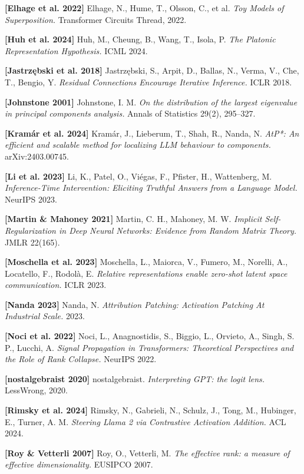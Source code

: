 \documentclass[10pt,letterpaper,twocolumn]{article}
\begin{document}
\textbf{{[}Elhage et al. 2022{]}} Elhage, N., Hume, T., Olsson, C., et al. \emph{Toy Models of Superposition.} Transformer Circuits Thread, 2022.

\textbf{{[}Huh et al. 2024{]}} Huh, M., Cheung, B., Wang, T., Isola, P. \emph{The Platonic Representation Hypothesis.} ICML 2024.

\textbf{{[}Jastrzębski et al. 2018{]}} Jastrzębski, S., Arpit, D., Ballas, N., Verma, V., Che, T., Bengio, Y. \emph{Residual Connections Encourage Iterative Inference.} ICLR 2018.

\textbf{{[}Johnstone 2001{]}} Johnstone, I. M. \emph{On the distribution of the largest eigenvalue in principal components analysis.} Annals of Statistics 29(2), 295--327.

\textbf{{[}Kramár et al. 2024{]}} Kramár, J., Lieberum, T., Shah, R., Nanda, N. \emph{AtP*: An efficient and scalable method for localizing LLM behaviour to components.} arXiv:2403.00745.

\textbf{{[}Li et al. 2023{]}} Li, K., Patel, O., Viégas, F., Pfister, H., Wattenberg, M. \emph{Inference-Time Intervention: Eliciting Truthful Answers from a Language Model.} NeurIPS 2023.

\textbf{{[}Martin \& Mahoney 2021{]}} Martin, C. H., Mahoney, M. W. \emph{Implicit Self-Regularization in Deep Neural Networks: Evidence from Random Matrix Theory.} JMLR 22(165).

\textbf{{[}Moschella et al. 2023{]}} Moschella, L., Maiorca, V., Fumero, M., Norelli, A., Locatello, F., Rodolà, E. \emph{Relative representations enable zero-shot latent space communication.} ICLR 2023.

\textbf{{[}Nanda 2023{]}} Nanda, N. \emph{Attribution Patching: Activation Patching At Industrial Scale.} 2023.

\textbf{{[}Noci et al. 2022{]}} Noci, L., Anagnostidis, S., Biggio, L., Orvieto, A., Singh, S. P., Lucchi, A. \emph{Signal Propagation in Transformers: Theoretical Perspectives and the Role of Rank Collapse.} NeurIPS 2022.

\textbf{{[}nostalgebraist 2020{]}} nostalgebraist. \emph{Interpreting GPT: the logit lens.} LessWrong, 2020.

\textbf{{[}Rimsky et al. 2024{]}} Rimsky, N., Gabrieli, N., Schulz, J., Tong, M., Hubinger, E., Turner, A. M. \emph{Steering Llama 2 via Contrastive Activation Addition.} ACL 2024.

\textbf{{[}Roy \& Vetterli 2007{]}} Roy, O., Vetterli, M. \emph{The effective rank: a measure of effective dimensionality.} EUSIPCO 2007.
\end{document}
